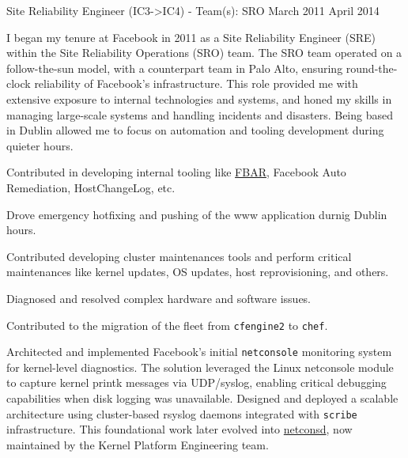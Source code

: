 \begin{cventries}
  \cventryprevrole
  {Site Reliability Engineer (IC3->IC4) - Team(s): SRO}
  {
    March 2011 \newline April 2014
  }
  {
    I began my tenure at Facebook in 2011 as a Site Reliability Engineer (SRE) within the Site Reliability Operations (SRO) team. The SRO team operated on a follow-the-sun model, with a counterpart team in Palo Alto, ensuring round-the-clock reliability of Facebook's infrastructure. This role provided me with extensive exposure to internal technologies and systems, and honed my skills in managing large-scale systems and handling incidents and disasters. Being based in Dublin allowed me to focus on automation and tooling development during quieter hours.
    \vspace{2mm}
    \begin{cvitems}
      \item {Contributed in developing internal tooling like \href{https://engineering.fb.com/2011/09/15/data-center-engineering/making-facebook-self-healing/}{FBAR}, Facebook Auto Remediation, HostChangeLog, etc.}
      \item {Drove emergency hotfixing and pushing of the www application durnig Dublin hours.}
      \item {Contributed developing cluster maintenances tools and perform critical maintenances like kernel updates, OS updates, host reprovisioning, and others.}
      \item {Diagnosed and resolved complex hardware and software issues.}
      \item {Contributed to the migration of the fleet from \texttt{cfengine2} to \texttt{chef}.}
      \item {Architected and implemented Facebook's initial \texttt{netconsole} monitoring system for kernel-level diagnostics.
                  The solution leveraged the Linux netconsole module to capture kernel printk messages via UDP/syslog, enabling critical
                  debugging capabilities when disk logging was unavailable. Designed and deployed a scalable architecture using
                  cluster-based rsyslog daemons integrated with \texttt{scribe} infrastructure. This foundational work later evolved
                  into \href{https://github.com/facebook/netconsd}{netconsd}, now maintained by the Kernel Platform Engineering team.}
    \end{cvitems}
  }


\end{cventries}
